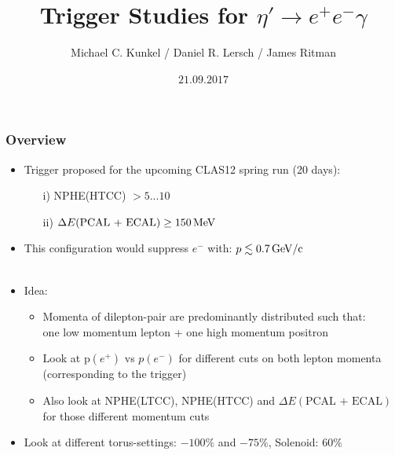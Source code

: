 \documentclass[xcolor=table, xcolor=dvipsnames]{beamer}
\begin{document}




\title[CLAS12: Run Group A]{Trigger Studies for $\eta' \rightarrow e^+e^-\gamma$}
    \author[]{Michael C. Kunkel / Daniel R. Lersch / James Ritman} 
      \date{$21.09.2017$} 
    
    \begin{frame}
      \titlepage
    \end{frame}
 
  \begin{frame}
    \frametitle{Overview}
    \footnotesize
    
    \begin{itemize}
      \item Trigger proposed for the upcoming CLAS12 spring run (20 days):
      \begin{itemize}
        \footnotesize
        \item[i)] NPHE(HTCC) $ > 5 ... 10$
        \item[ii)] $\Delta E(\text{PCAL + ECAL}) \ge 150\,\rm{MeV}$
      \end{itemize}
      \item This configuration would suppress $e^-$ with: $p \lesssim 0.7\,\rm{GeV/c}$ \\ {\color{blue}{$\Rightarrow$ Implemented in the actual CLAS12 PID-algorithm}} \\ {\color{blue}{$\Rightarrow$ We can do better than that}}
      \item Idea: 
      \begin{itemize}
        \footnotesize
        \item Momenta of dilepton-pair are predominantly distributed such that: \\ one low momentum lepton + one high momentum positron
        \item Look at p$(e^+)$ vs $p(e^-)$ for different cuts on both lepton momenta (corresponding to the trigger)\\  {\color{red}{$\Rightarrow$ Determine ratio of rejected / accepted events}}
        \item Also look at NPHE(LTCC), NPHE(HTCC) and $\Delta E(\text{PCAL + ECAL})$ for those different momentum cuts
      \end{itemize}
      \item Look at different torus-settings: $-100\%$ and $-75\%$, Solenoid: $60\%$
      \end{itemize}
      \end{frame}
      
\end{document}
